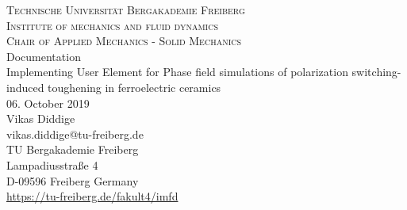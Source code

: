 \documentclass[fontsize=11pt, a4, paper=landscape,pagesize=dvips]{article}
\begin{document}
\begin{titlepage}\thispagestyle{empty}
\begin{center}
\LARGE{\textsc{Technische Universit\"{a}t Bergakademie Freiberg\\
   Institute of mechanics and fluid dynamics\\
   Chair of Applied Mechanics - Solid Mechanics\\} }
   \vspace{40mm}
Documentation\\
   \vspace{5mm}
Implementing User Element for Phase field simulations of polarization switching-induced
toughening in ferroelectric ceramics\\
   \vspace{5mm}
   06. October 2019\\
   \vspace{20mm}
   Vikas Diddige\\
   vikas.diddige@tu-freiberg.de\\
   \vspace{10mm}   
   TU Bergakademie Freiberg\\
   Lampadiusstra\ss e 4\\
   D-09596 Freiberg Germany\\
   \large\url{https://tu-freiberg.de/fakult4/imfd}

\end{center}
\end{titlepage}

\clearpage
\newpage
\twocolumn
\tableofcontents %

\clearpage
\newpage
{}

\newpage

\end{document}
